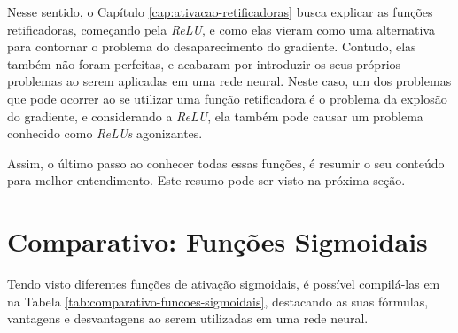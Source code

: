 Nesse sentido, o Capítulo \ref{cap:ativacao-retificadoras} busca explicar as funções retificadoras, começando pela \textit{ReLU}, e como elas vieram como uma alternativa para contornar o problema do desaparecimento do gradiente. Contudo, elas também não foram perfeitas, e acabaram por introduzir os seus próprios problemas ao serem aplicadas em uma rede neural. Neste caso, um dos problemas que pode ocorrer ao se utilizar uma função retificadora é o problema da explosão do gradiente, e considerando a \textit{ReLU}, ela também pode causar um problema conhecido como \textit{ReLUs} agonizantes.

Assim, o último passo ao conhecer todas essas funções, é resumir o seu conteúdo para melhor entendimento. Este resumo pode ser visto na próxima seção.

\section{Comparativo: Funções Sigmoidais}

Tendo visto diferentes funções de ativação sigmoidais, é possível compilá-las em na Tabela \ref{tab:comparativo-funcoes-sigmoidais}, destacando as suas fórmulas, vantagens e desvantagens ao serem utilizadas em uma rede neural.


